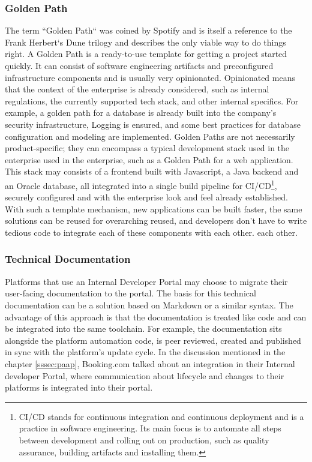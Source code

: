 \documentclass[a4paper,12pt]{article}
\begin{document}
    \subsubsection{Golden Path}
    \label{sssec:goldenpath}
    The term ``Golden Path`` was coined by Spotify\parencite{spotifygoldenpath} and is itself a reference to the Frank
    Herbert`s Dune trilogy and describes the only viable way to do things right.
    A Golden Path is a ready-to-use template for getting a project started quickly.
    It can consist of software engineering artifacts and preconfigured infrastructure components and is usually very
    opinionated.
    Opinionated means that the context of the enterprise is already considered, such as internal regulations,
    the currently supported tech stack, and other internal specifics.
    For example, a golden path for a database is already built into the company's security infrastructure,
    Logging is ensured, and some best practices for database configuration and modeling are implemented.
    Golden Paths are not necessarily product-specific; they can encompass a typical development stack used in the enterprise
    used in the enterprise, such as a Golden Path for a web application.
    This stack may consists of a frontend built
    with Javascript, a Java backend and an Oracle database, all integrated into a single build pipeline for CI/CD\footnote{CI/CD stands for continuous
    integration and continuous deployment and is a practice in software engineering. Its main focus is to automate all steps
    between development and rolling out on production, such as quality assurance, building artifacts and installing them.},
    securely configured and with the enterprise look and feel already established.
    With such a template mechanism, new applications can be built faster, the same solutions can be reused for overarching
    reused, and developers don't have to write tedious code to integrate each of these components with each other.
    each other.

    \subsubsection{Technical Documentation}
    \label{sssec:techdoc}
    Platforms that use an Internal Developer Portal may choose to migrate their user-facing documentation to the portal.
    The basis for this technical documentation can be a solution based on Markdown\parencite{backstagetechdocs}
    or a similar syntax.
    The advantage of this approach is that the documentation is treated like code and can be integrated into the same toolchain.
    For example, the documentation sits alongside the platform automation code, is peer reviewed, created
    and published in sync with the platform's update cycle.
    In the discussion mentioned in the chapter \ref{sssec:paap}, Booking.com talked about an integration in their Internal
    developer Portal, where communication about lifecycle and changes to their platforms is integrated into their portal.
\end{document}
